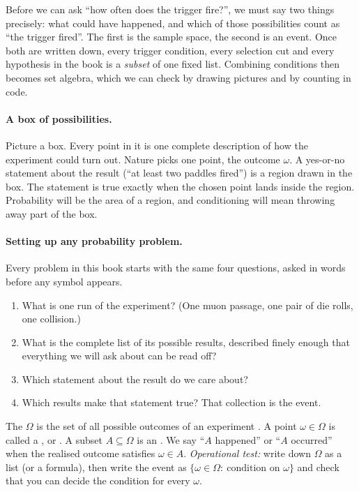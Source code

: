 Before we can ask ``how often does the trigger fire?'', we must say two things
precisely: what could have happened, and which of those possibilities count as
``the trigger fired''. The first is the sample space, the second is an event.
Once both are written down, every trigger condition, every selection cut and
every hypothesis in the book is a \emph{subset} of one fixed list. Combining
conditions then becomes set algebra, which we can check by drawing pictures and
by counting in code.

\paragraph{A box of possibilities.}
Picture a box. Every point in it is one complete description of how the
experiment could turn out. Nature picks one point, the outcome $\omega$. A
yes-or-no statement about the result (``at least two paddles fired'') is a
region drawn in the box. The statement is true exactly when the chosen point
lands inside the region. Probability will be the area of a region, and
conditioning will mean throwing away part of the box.

\paragraph{Setting up any probability problem.}
Every problem in this book starts with the same four questions, asked in words before any symbol appears.
\begin{enumerate}[leftmargin=1.5em,itemsep=1pt]
  \item What is one run of the experiment? (One muon passage, one pair of die
        rolls, one collision.)
  \item What is the complete list of its possible results, described finely
        enough that everything we will ask about can be read off?
  \item Which statement about the result do we care about?
  \item Which results make that statement true? That collection is the event.
\end{enumerate}

\begin{workdef}
The  $\Omega$ is the set of all possible outcomes of an
experiment . A point $\omega\in\Omega$ is called a
,  or 
. A subset
$A\subseteq\Omega$ is an  . We say ``$A$ happened''
or ``$A$ occurred'' when the realised outcome satisfies $\omega\in A$.
\emph{Operational test:} write down $\Omega$ as a list (or a formula), then
write the event as $\{\omega\in\Omega:\ \text{condition on }\omega\}$ and check
that you can decide the condition for every $\omega$.
\end{workdef}

